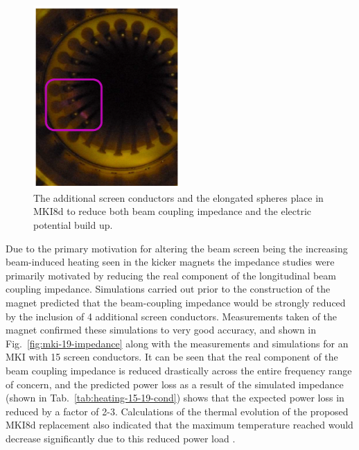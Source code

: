 \begin{figure}
\begin{center}
\includegraphics[width=0.5\textwidth]{LHC_MKI/figures/mki8d-balls.png}
\end{center}
\label{fig:mki8d-points}
\caption{The additional screen conductors and the elongated spheres place in MKI8d to reduce both beam coupling impedance and the electric potential build up.}
\end{figure}

Due to the primary motivation for altering the beam screen being the increasing beam-induced heating seen in the kicker magnets the impedance studies were primarily motivated by reducing the real component of the longitudinal beam coupling impedance. Simulations carried out prior to the construction of the magnet predicted that the beam-coupling impedance would be strongly reduced by the inclusion of 4 additional screen conductors. Measurements taken of the magnet  confirmed these simulations to very good accuracy, and shown in Fig.~\ref{fig:mki-19-impedance} along with the measurements and simulations for an MKI with 15 screen conductors. It can be seen that the real component of the beam coupling impedance is reduced drastically across the entire frequency range of concern, and the predicted power loss as a result of the simulated impedance (shown in Tab.~\ref{tab:heating-15-19-cond}) shows that the expected power loss in reduced by a factor of 2-3. Calculations of the thermal evolution of the proposed MKI8d replacement also indicated that the maximum temperature reached would decrease significantly due to this reduced power load \cite{Garlasche:2dHeatEmis}. 

